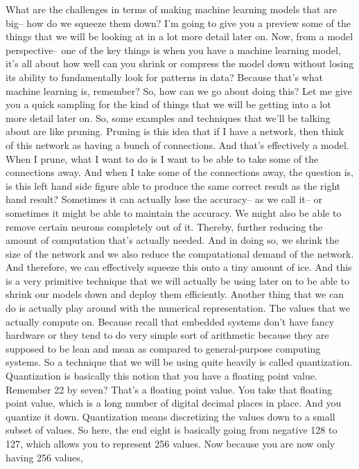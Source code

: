 What are the challenges in terms of making machine learning models that are big-- how do we squeeze them down?
I'm going to give you a preview some of the things that we will be looking at in a lot more detail later on.
Now, from a model perspective-- one of the key things is when you have a machine learning model, it's all about how well can you shrink or compress the model down without losing its ability to fundamentally look for patterns in data?
Because that's what machine learning is, remember?
So, how can we go about doing this?
Let me give you a quick sampling for the kind of things that we will be getting into a lot more detail later on.
So, some examples and techniques that we'll be talking about are like pruning.
Pruning is this idea that if I have a network, then think of this network as having a bunch of connections.
And that's effectively a model.
When I prune, what I want to do is I want to be able to take some of the connections away.
And when I take some of the connections away, the question is, is this left hand side figure able to produce the same correct result as the right hand result?
Sometimes it can actually lose the accuracy-- as we call it-- or sometimes it might be able to maintain the accuracy.
We might also be able to remove certain neurons completely out of it.
Thereby, further reducing the amount of computation that's actually needed.
And in doing so, we shrink the size of the network and we also reduce the computational demand of the network.
And therefore, we can effectively squeeze this onto a tiny amount of ice.
And this is a very primitive technique that we will actually be using later on to be able to shrink our models down and deploy them efficiently.
Another thing that we can do is actually play around with the numerical representation.
The values that we actually compute on.
Because recall that embedded systems don't have fancy hardware or they tend to do very simple sort of arithmetic because they are supposed to be lean and mean as compared to general-purpose computing systems.
So a technique that we will be using quite heavily is called quantization.
Quantization is basically this notion that you have a floating point value.
Remember 22 by seven?
That's a floating point value.
You take that floating point value, which
is a long number of digital decimal places in place.
And you quantize it down.
Quantization means discretizing the values down
to a small subset of values.
So here, the end eight is basically going from negative 128 to 127,
which allows you to represent 256 values.
Now because you are now only having 256 values,

